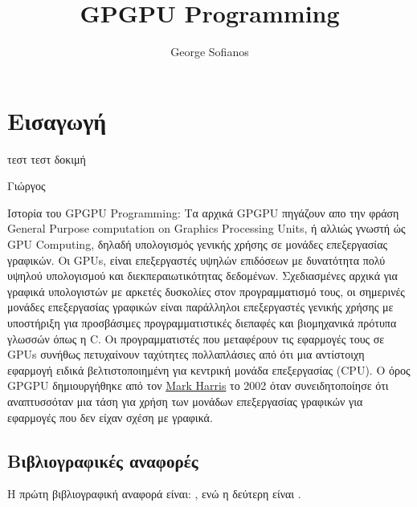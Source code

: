 \documentclass[11pt,a4paper]{book}
\author{George Sofianos}
\title{GPGPU Programming}
\begin{document}
\maketitle
 
\tableofcontents

\chapter{Εισαγωγή}
\epigraph{τεστ τεστ δοκιμή}{Γιώργος}
Ιστορία του GPGPU Programming:
Τα αρχικά GPGPU πηγάζουν απο την φράση General Purpose computation on Graphics Processing Units, ή αλλιώς γνωστή ώς GPU Computing, δηλαδή υπολογισμός γενικής χρήσης σε μονάδες επεξεργασίας γραφικών.
Οι GPUs, είναι επεξεργαστές υψηλών επιδόσεων με δυνατότητα πολύ υψηλού υπολογισμού και διεκπεραιωτικότητας δεδομένων. Σχεδιασμένες αρχικά για γραφικά υπολογιστών με αρκετές δυσκολίες στον προγραμματισμό τους, οι σημερινές μονάδες επεξεργασίας γραφικών είναι παράλληλοι επεξεργαστές γενικής χρήσης με υποστήριξη για προσβάσιμες προγραμματιστικές διεπαφές και βιομηχανικά πρότυπα γλωσσών όπως η C. Οι προγραμματιστές που μεταφέρουν τις εφαρμογές τους σε GPUs συνήθως πετυχαίνουν ταχύτητες πολλαπλάσιες από ότι μια αντίστοιχη εφαρμογή ειδικά βελτιστοποιημένη για κεντρική μονάδα επεξεργασίας (CPU).
Ο όρος GPGPU δημιουργήθηκε από τον \href{http://en.wikipedia.org/wiki/Mark_Harris_(programmer)}{Mark Harris} το 2002 όταν συνειδητοποίησε ότι αναπτυσσόταν μια τάση για χρήση των μονάδων επεξεργασίας γραφικών για εφαρμογές που δεν είχαν σχέση με γραφικά. 




\section{Βιβλιογραφικές αναφορές}
H πρώτη βιβλιογραφική αναφορά είναι: \parencite{doe}, ενώ η δεύτερη είναι \parencite{papadopoulos}.

\printbibliography[title={Βιβλιογραφία}]
\end{document}
